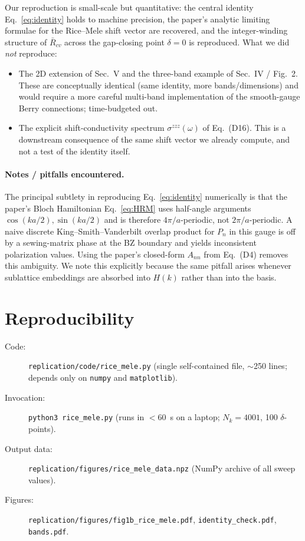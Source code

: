 \documentclass[11pt]{article}
\begin{document}
Our reproduction is small-scale but quantitative: the central
identity Eq.~\eqref{eq:identity} holds to machine precision, the
paper's analytic limiting formulae for the Rice--Mele shift
vector are recovered, and the integer-winding structure of
$\bar R_{cv}$ across the gap-closing point $\delta=0$ is
reproduced. What we did \emph{not} reproduce:

\begin{itemize}
  \item The 2D extension of Sec.~V and the three-band example of
    Sec.~IV / Fig.~2. These are conceptually identical (same
    identity, more bands/dimensions) and would require a more
    careful multi-band implementation of the smooth-gauge Berry
    connections; time-budgeted out.
  \item The explicit shift-conductivity spectrum
    $\sigma^{zzz}(\omega)$ of Eq.~(D16). This is a downstream
    consequence of the same shift vector we already compute, and
    not a test of the identity itself.
\end{itemize}

\paragraph{Notes / pitfalls encountered.}
The principal subtlety in reproducing Eq.~\eqref{eq:identity} numerically
is that the paper's Bloch Hamiltonian Eq.~\eqref{eq:HRM} uses
half-angle arguments $\cos(ka/2), \sin(ka/2)$ and is therefore
$4\pi/a$-periodic, not $2\pi/a$-periodic. A naive discrete
King--Smith--Vanderbilt overlap product for $P_n$ in this gauge is
off by a sewing-matrix phase at the BZ boundary and yields
inconsistent polarization values. Using the paper's closed-form
$A_{nn}$ from Eq.~(D4) removes this ambiguity. We note this
explicitly because the same pitfall arises whenever sublattice
embeddings are absorbed into $H(k)$ rather than into the basis.

\section{Reproducibility}

\begin{description}
  \item[Code:] \texttt{replication/code/rice\_mele.py} (single
    self-contained file, $\sim$250 lines; depends only on
    \texttt{numpy} and \texttt{matplotlib}).
  \item[Invocation:] \texttt{python3 rice\_mele.py}
    (runs in $<\!60$~s on a laptop; $N_k=4001$, 100 $\delta$-points).
  \item[Output data:] \texttt{replication/figures/rice\_mele\_data.npz}
    (NumPy archive of all sweep values).
  \item[Figures:] \texttt{replication/figures/fig1b\_rice\_mele.pdf},
    \texttt{identity\_check.pdf}, \texttt{bands.pdf}.
\end{description}
\end{document}
